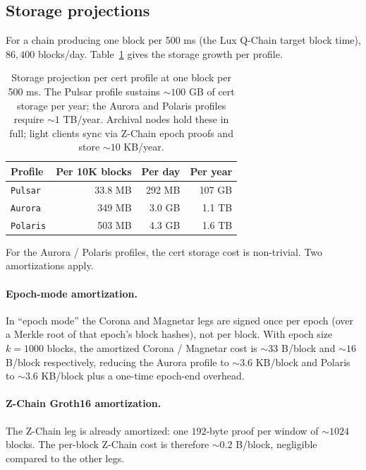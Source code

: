 \subsection{Storage projections}

For a chain producing one block per 500 ms (the Lux Q-Chain target
block time), $86{,}400$ blocks/day. Table~\ref{tab:storage} gives
the storage growth per profile.

\begin{table}[ht]
\centering
\small
\begin{tabular}{@{}lrrr@{}}
\toprule
\textbf{Profile} & \textbf{Per 10K blocks} & \textbf{Per day} & \textbf{Per year} \\
\midrule
\texttt{Pulsar}  & 33.8 MB  & 292 MB  & 107 GB  \\
\texttt{Aurora}  & 349 MB   & 3.0 GB  & 1.1 TB  \\
\texttt{Polaris} & 503 MB   & 4.3 GB  & 1.6 TB  \\
\bottomrule
\end{tabular}
\caption{Storage projection per cert profile at one block per 500 ms.
The Pulsar profile sustains $\sim 100$ GB of cert storage per year;
the Aurora and Polaris profiles require $\sim 1$ TB/year. Archival
nodes hold these in full; light clients sync via Z-Chain epoch
proofs and store $\sim 10$ KB/year.}
\label{tab:storage}
\end{table}

For the Aurora / Polaris profiles, the cert storage cost is
non-trivial. Two amortizations apply.

\paragraph{Epoch-mode amortization.} In ``epoch mode'' the Corona
and Magnetar legs are signed once per epoch (over a Merkle root of
that epoch's block hashes), not per block. With epoch size $k =
1000$ blocks, the amortized Corona / Magnetar cost is $\sim 33$
B/block and $\sim 16$ B/block respectively, reducing the Aurora
profile to $\sim 3.6$ KB/block and Polaris to $\sim 3.6$ KB/block
plus a one-time epoch-end overhead.

\paragraph{Z-Chain Groth16 amortization.} The Z-Chain leg is
already amortized: one $192$-byte proof per window of $\sim 1024$
blocks. The per-block Z-Chain cost is therefore $\sim 0.2$ B/block,
negligible compared to the other legs.

